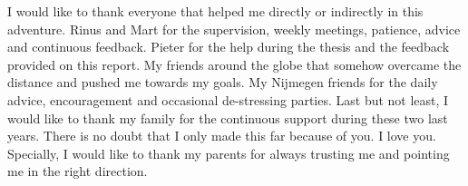 I would like to thank everyone that helped me directly or indirectly in this adventure. Rinus and Mart for the supervision, weekly meetings, patience, advice and continuous feedback. Pieter for the help during the thesis and the feedback provided on this report. My friends around the globe that somehow overcame the distance and pushed me towards my goals. My Nijmegen friends for the daily advice, encouragement and occasional de-stressing parties. Last but not least, I would like to thank my family for the continuous support during these two last years. There is no doubt that I only made this far because of you. I love you. Specially, I would like to thank my parents for always trusting me and pointing me in the right direction. 

